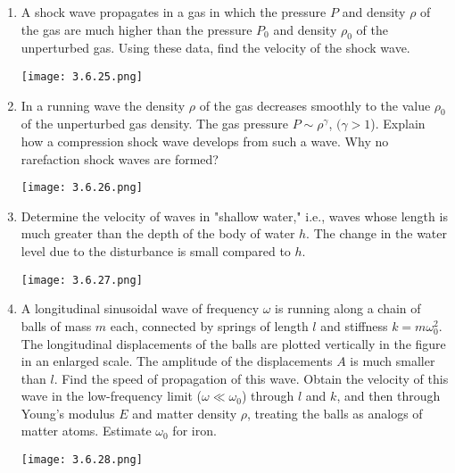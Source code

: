 \documentclass{article}
\begin{document}
\begin{enumerate}[label=3.6.\arabic*]
\item A shock wave propagates in a gas in which the pressure $P$ and density $\rho$ of the gas are much higher than the pressure $P_0$ and density $\rho_0$ of the unperturbed gas. Using these data, find the velocity of the shock wave.

\begin{center}
    \texttt{[image: 3.6.25.png]}
\end{center}

\item In a running wave the density $\rho$ of the gas decreases smoothly to the value $\rho_0$ of the unperturbed gas density. The gas pressure $P \sim \rho^{\gamma}$, $(\gamma > 1$). Explain how a compression shock wave develops from such a wave. Why no rarefaction shock waves are formed?

\begin{center}
    \texttt{[image: 3.6.26.png]}
\end{center}

\item Determine the velocity of waves in "shallow water," i.e., waves whose length is much greater than the depth of the body of water $h$. The change in the water level due to the disturbance is small compared to $h$.

\begin{center}
    \texttt{[image: 3.6.27.png]}
\end{center}

\item A longitudinal sinusoidal wave of frequency $\omega$ is running along a chain of balls of mass $m$ each, connected by springs of length $l$ and stiffness $k = m \omega_0^2$. The longitudinal displacements of the balls are plotted vertically in the figure in an enlarged scale. The amplitude of the displacements $A$ is much smaller than $l$. Find the speed of propagation of this wave. Obtain the velocity of this wave in the low-frequency limit ($\omega \ll \omega_0$) through $l$ and $k$, and then through Young's modulus $E$ and matter density $\rho$, treating the balls as analogs of matter atoms. Estimate $\omega_0$ for iron.

\begin{center}
    \texttt{[image: 3.6.28.png]}
\end{center}






\end{enumerate}
\end{document}
